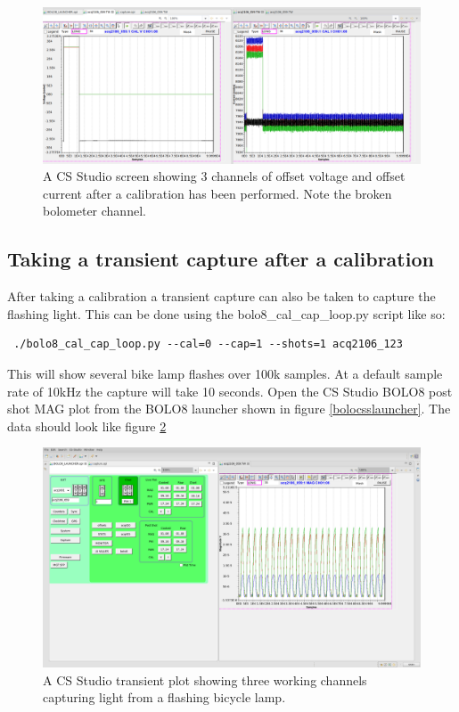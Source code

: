 \documentclass{article}
\begin{document}
\begin{figure} [hbt!]
	\centering
	\includegraphics[width=5.0in]{images/bolo-css-current-volts.png}
	\caption{A CS Studio screen showing 3 channels of offset voltage and offset current after a calibration has been performed. Note the broken bolometer channel.}
	\label{currentvoltage}
\end{figure}

\subsection{Taking a transient capture after a calibration}
After taking a calibration a transient capture can also be taken to capture the flashing light.
This can be done using the bolo8\_cal\_cap\_loop.py script like so:

\begin{verbatim} ./bolo8_cal_cap_loop.py --cal=0 --cap=1 --shots=1 acq2106_123\end{verbatim}

This will show several bike lamp flashes over 100k samples.
At a default sample rate of 10kHz the capture will take 10 seconds.
Open the CS Studio BOLO8 post shot MAG plot from the BOLO8 launcher shown in figure \ref{bolocsslauncher}.
The data should look like figure \ref{cssbolotransient}

\begin{figure} [hbt!]
	\centering
	\includegraphics[width=5.0in]{images/bolo-css-transient.png}
	\caption{A CS Studio transient plot showing three working channels capturing light from a flashing bicycle lamp.}
	\label{cssbolotransient}
\end{figure}
\end{document}
